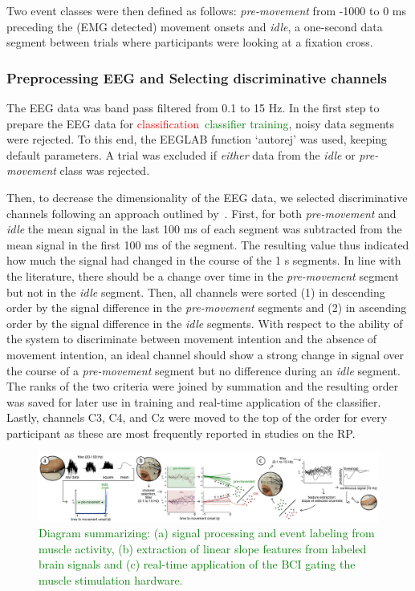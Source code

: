 Two event classes were then defined as follows: \textit{pre-movement} from -1000 to 0 ms preceding the (EMG detected) movement onsets and \textit{idle}, a one-second data segment between trials where participants were looking at a fixation cross.

\subsubsection{Preprocessing EEG and Selecting discriminative channels}\label{eeg_methods}
The EEG data was band pass filtered from 0.1 to 15 Hz. In the first step to prepare the EEG data for \textcolor{red}{classification}~\textcolor{green}{classifier training}, noisy data segments were rejected. To this end, the EEGLAB function `autorej' was used, keeping default parameters. A trial was excluded if \textit{either} data from the \textit{idle} or \textit{pre-movement} class was rejected.

Then, to decrease the dimensionality of the EEG data, we selected discriminative channels following an approach outlined by~\citep{Schultze-Kraft2021-cu}. First, for both \textit{pre-movement} and \textit{idle} the mean signal in the last 100 ms of each segment was subtracted from the mean signal in the first 100 ms of the segment. The resulting value thus indicated how much the signal had changed in the course of the 1 s segments. In line with the literature, there should be a change over time in the \textit{pre-movement} segment but not in the \textit{idle} segment. Then, all channels were sorted (1) in descending order by the signal difference in the \textit{pre-movement} segments and (2) in ascending order by the signal difference in the \textit{idle} segments. With respect to the ability of the system to discriminate between movement intention and the absence of movement intention, an ideal channel should show a strong change in signal over the course of a \textit{pre-movement} segment but no difference during an \textit{idle} segment. The ranks of the two criteria were joined by summation and the resulting order was saved for later use in training and real-time application of the classifier. Lastly, channels C3, C4, and Cz were moved to the top of the order for every participant as these are most frequently reported in studies on the RP.

\begin{figure}[!h]
    \centering
    \includegraphics[width=\textwidth]{figures/method.png}
    \caption{\textcolor{green}{Diagram summarizing: (a) signal processing and event labeling from muscle activity, (b) extraction of linear slope features from labeled brain signals and (c) real-time application of the BCI gating the muscle stimulation hardware.}}
    \label{fig:method}
\end{figure}

